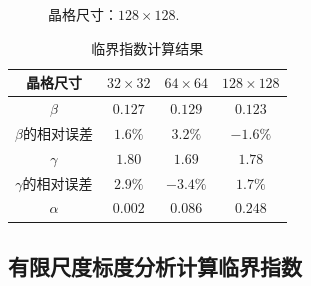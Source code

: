 \documentclass[UTF8,10pt,a4paper]{article}
\theoremstyle{Problem}
\theoremstyle{Solution}
\begin{document}
\clearpage
\begin{figure}[ht]
    \caption{晶格尺寸：$128\times 128$.}
    \label{128-128-fit}
\end{figure}

\begin{table}[ht]
    \centering
    \caption{临界指数计算结果}
    \label{critical-coefficient}
    \begin{tabular}{c|ccc}
    晶格尺寸 & $32\times 32$ & $64\times 64$ & $128\times 128$ \\ \hline
    $\beta$ & $0.127$ & $0.129$ & $0.123$ \\
    $\beta$的相对误差 & $1.6\%$ & $3.2\%$ & $-1.6\%$ \\
    $\gamma$ & $1.80$ & $1.69$ & $1.78$ \\
    $\gamma$的相对误差 & $2.9\%$ & $-3.4\%$ & $1.7\%$ \\
    $\alpha$ & $0.002$ & $0.086$ & $0.248$
    \end{tabular}
\end{table}


\clearpage

\subsection{有限尺度标度分析计算临界指数}
\end{document}
